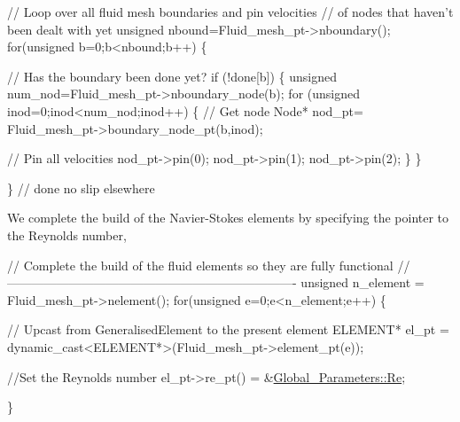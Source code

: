 \begin{DoxyCodeInclude}
 
 
 
 \textcolor{comment}{// Loop over all fluid mesh boundaries and pin velocities}
 \textcolor{comment}{// of nodes that haven't been dealt with yet}
 \textcolor{keywordtype}{unsigned} nbound=Fluid\_mesh\_pt->nboundary();
 \textcolor{keywordflow}{for}(\textcolor{keywordtype}{unsigned} b=0;b<nbound;b++)
  \{

   \textcolor{comment}{// Has the boundary been done yet?}
   \textcolor{keywordflow}{if} (!done[b])
    \{
     \textcolor{keywordtype}{unsigned} num\_nod=Fluid\_mesh\_pt->nboundary\_node(b);
     \textcolor{keywordflow}{for} (\textcolor{keywordtype}{unsigned} inod=0;inod<num\_nod;inod++)
      \{
       \textcolor{comment}{// Get node}
       Node* nod\_pt= Fluid\_mesh\_pt->boundary\_node\_pt(b,inod);
       
       \textcolor{comment}{// Pin all velocities}
       nod\_pt->pin(0); 
       nod\_pt->pin(1); 
       nod\_pt->pin(2); 
      \}
    \}

  \} \textcolor{comment}{// done no slip elsewhere }

\end{DoxyCodeInclude}


We complete the build of the Navier-\/\+Stokes elements by specifying the pointer to the Reynolds number,


\begin{DoxyCodeInclude}
 
 
 \textcolor{comment}{// Complete the build of the fluid elements so they are fully functional}
 \textcolor{comment}{//----------------------------------------------------------------------}
 \textcolor{keywordtype}{unsigned} n\_element = Fluid\_mesh\_pt->nelement();
 \textcolor{keywordflow}{for}(\textcolor{keywordtype}{unsigned} e=0;e<n\_element;e++)
  \{

   \textcolor{comment}{// Upcast from GeneralisedElement to the present element}
   ELEMENT* el\_pt = \textcolor{keyword}{dynamic\_cast<}ELEMENT*\textcolor{keyword}{>}(Fluid\_mesh\_pt->element\_pt(e));
   
   \textcolor{comment}{//Set the Reynolds number}
   el\_pt->re\_pt() = &\hyperlink{namespaceGlobal__Parameters_a9d72e94a9305c6a310940a6a427ebe06}{Global\_Parameters::Re};   

  \} 

\end{DoxyCodeInclude}


